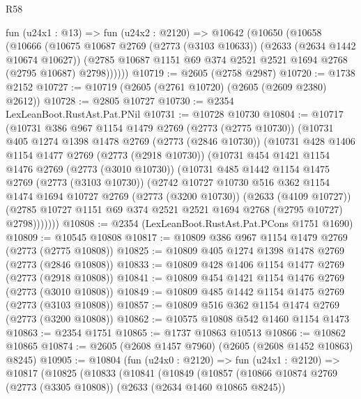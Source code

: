 \begin{lexlean}{R58}
\begin{coremodule}
    fun (u24x1 : @13) =>
    fun (u24x2 : @2120) =>
    @10642
      (@10650
        (@10658
          (@10666
            (@10675
              @10687
              @2769
              (@2773 (@3103 @10633))
              (@2633 (@2634 @1442 @10674 @10627))
              (@2785 @10687 @1151 @69 @374 @2521 @2521 @1694 @2768 (@2795 @10687) @2798))))))
@10719 := @2605 (@2758 @2987)
@10720 := @1738 @2152
@10727 := @10719 (@2605 (@2761 @10720) (@2605 (@2609 @2380) @2612))
@10728 := @2805 @10727
@10730 := @2354 LexLeanBoot.RustAst.Pat.PNil
@10731 := @10728 @10730
@10804 := @10717
    (@10731
      @386
      @967
      @1154
      @1479
      @2769
      (@2773 (@2775 @10730))
      (@10731
        @405
        @1274
        @1398
        @1478
        @2769
        (@2773 (@2846 @10730))
        (@10731
          @428
          @1406
          @1154
          @1477
          @2769
          (@2773 (@2918 @10730))
          (@10731
            @454
            @1421
            @1154
            @1476
            @2769
            (@2773 (@3010 @10730))
            (@10731
              @485
              @1442
              @1154
              @1475
              @2769
              (@2773 (@3103 @10730))
              (@2742
                @10727
                @10730
                @516
                @362
                @1154
                @1474
                @1694
                @10727
                @2769
                (@2773 (@3200 @10730))
                (@2633 (@4109 @10727))
                (@2785 @10727 @1151 @69 @374 @2521 @2521 @1694 @2768 (@2795 @10727) @2798)))))))
@10808 := @2354 (LexLeanBoot.RustAst.Pat.PCons @1751 @1690)
@10809 := @10545 @10808
@10817 := @10809 @386 @967 @1154 @1479 @2769 (@2773 (@2775 @10808))
@10825 := @10809 @405 @1274 @1398 @1478 @2769 (@2773 (@2846 @10808))
@10833 := @10809 @428 @1406 @1154 @1477 @2769 (@2773 (@2918 @10808))
@10841 := @10809 @454 @1421 @1154 @1476 @2769 (@2773 (@3010 @10808))
@10849 := @10809 @485 @1442 @1154 @1475 @2769 (@2773 (@3103 @10808))
@10857 := @10809 @516 @362 @1154 @1474 @2769 (@2773 (@3200 @10808))
@10862 := @10575 @10808 @542 @1460 @1154 @1473
@10863 := @2354 @1751
@10865 := @1737 @10863 @10513
@10866 := @10862 @10865
@10874 := @2605 (@2608 @1457 @7960) (@2605 (@2608 @1452 @10863) @8245)
@10905 := @10804
    (fun (u24x0 : @2120) =>
    fun (u24x1 : @2120) =>
    @10817
      (@10825
        (@10833
          (@10841
            (@10849
              (@10857
                (@10866
                  @10874
                  @2769
                  (@2773 (@3305 @10808))
                  (@2633 (@2634 @1460 @10865 @8245))

\end{coremodule}
\end{lexlean}
